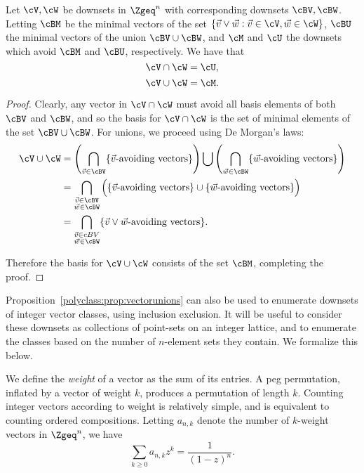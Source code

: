 \documentclass[12pt,twoside]{memoir}
\begin{document}
      \begin{proposition} \label{polyclass:prop:vectorunions}
        Let $\cV, \cW$ be downsets in $\Zgeq^n$ with corresponding downsets $\cBV,
        \cBW$.  Letting $\cBM$ be the minimal vectors of the set $\{\vec v \vee
        \vec w : \vec v \in \cV, \vec w \in \cW \}$, 
        $\cBU$ the minimal vectors of the union $\cBV \cup \cBW$, and $\cM$
        and $\cU$ the downsets which avoid $\cBM$ and $\cBU$, respectively. We
        have that 
        $$ \cV \cap \cW = \cU, $$
        $$ \cV \cup \cW = \cM .$$
      \end{proposition}
      \begin{proof}
        Clearly, any vector in $\cV \cap \cW$ must avoid all basis elements of
        both $\cBV$ and $\cBW$, and so the basis for $\cV \cap \cW $ is the set
        of minimal elements of the set $\cBV \cup \cBW$. For
        unions, we proceed using De Morgan's laws:
        $$ \begin{aligned}
          \cV \cup \cW
          &= \left( \bigcap_{\vec v \in \cBV} \{\vec v \mbox{-avoiding
                vectors}\}\right) \bigcup
             \left( \bigcap_{\vec w \in \cBW} \{\vec w \mbox{-avoiding
                vectors}\}\right) \\
          &= \bigcap_{\substack{ \vec v \in \cBV \\ \vec w \in \cBW }} 
            \Big( \{\vec v \mbox{-avoiding vectors}\} 
              \cup \{\vec w \mbox{-avoiding vectors}\}\Big) \\
          &= \bigcap_{\substack{ \vec v \in cBV \\ \vec w \in \cBW }} 
              \{\vec v \vee \vec w \mbox{-avoiding vectors}\}.
          \end{aligned} $$

        Therefore the basis for $\cV \cup \cW$ consists of the set $\cBM$,
        completing the proof.
        \end{proof}

        Proposition~\ref{polyclass:prop:vectorunions} can also be used to enumerate 
        downsets of integer vector classes, using inclusion exclusion. It will be
        useful to consider these downsets as collections of point-sets on an integer
        lattice, and to enumerate the classes based on the number of $n$-element
        sets they contain. We formalize this below. 

      We define the \emph{weight} of a vector as the sum of its entries. A peg
      permutation, inflated by a vector of weight $k$, produces a permutation of
      length $k$. Counting integer vectors according to weight is relatively
      simple, and is equivalent to counting ordered compositions. Letting
      $a_{n,k}$ denote the number of $k$-weight vectors in $\Zgeq^n$, we have 
      $$ \sum_{k \geq 0} a_{n,k} z^k = \frac{1}{(1 - z)^n}.$$
\end{document}
